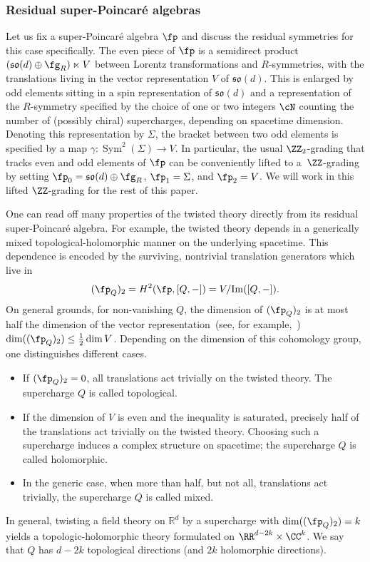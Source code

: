 \documentclass[10pt,a4paper]{amsart}
\numberwithin{equation}{section}
\theoremstyle{definition}
\def\R{\mathbb{R}}
\def\lie#1{\ensuremath{\mathfrak{#1}}}
\DeclareMathOperator{\Sym}{Sym}
\begin{document}
\subsubsection{Residual super-Poincar\'e algebras}
Let us fix a super-Poincar\'e algebra $\fp$ and discuss the residual symmetries for this case specifically. The even piece of $\fp$ is a semidirect product $(\lie{so}(d) \oplus \fg_R) \ltimes V$ between Lorentz transformations and $R$-symmetries, with the translations living in the vector representation $V$ of $\lie{so}(d)$. This is enlarged by odd elements sitting in a spin representation of $\lie{so}(d)$ and a representation of the $R$-symmetry specified by the choice of one or two integers $\cN$ counting the number of (possibly chiral) supercharges, depending on spacetime dimension. Denoting this representation by $\Sigma$, the bracket between two odd elements is specified by a map
$
 \gamma\colon \Sym^2(\Sigma) \longrightarrow V$.
In particular, the usual $\ZZ_2$-grading that tracks even and odd elements of $\fp$ can be conveniently lifted to a~$\ZZ$-grading by setting $\fp_0 = \lie{so}(d) \oplus \fg_R$, $\fp_1 = \Sigma$, and $\fp_2 = V$. We will work in this lifted $\ZZ$-grading for the rest of this paper.

One can read off many properties of the twisted theory directly from its residual super-Poincar\'e algebra. For example, the twisted theory depends in a generically mixed topological-holomorphic manner on the underlying spacetime. This dependence is encoded by the surviving, nontrivial translation generators which live in
\[
(\fp_Q)_2 = H^2(\fp,[Q,-]) = V/\mathrm{Im}([Q,-]) .
\]
On general grounds, for non-vanishing $Q$, the dimension of $(\fp_Q)_2$ is at most half the dimension of the vector representation~(see, for example,~\cite{ElliottSafronov})
$
\dim((\fp_Q)_2) \leq \frac{1}{2} \dim V $.
Depending on the dimension of this cohomology group, one distinguishes different cases.
\begin{itemize}\itemsep=0pt
	\item[--] If $(\fp_Q)_2=0$, all translations act trivially on the twisted theory. The supercharge $Q$ is called topological.
	\item[--] If the dimension of $V$ is even and the inequality is saturated, precisely half of the translations act trivially on the twisted theory. Choosing such a supercharge induces a complex structure on spacetime; the supercharge $Q$ is called holomorphic.
	\item[--] In the generic case, when more than half, but not all, translations act trivially, the supercharge $Q$ is called mixed.
\end{itemize}
In general, twisting a field theory on $\R^d$ by a supercharge with
$
\dim((\fp_Q)_2) = k
$
yields a topologic-holomorphic theory formulated on $\RR^{d-2k} \times \CC^k$. We say that $Q$ has $d-2k$ topological directions (and $2k$ holomorphic directions).
\end{document}
